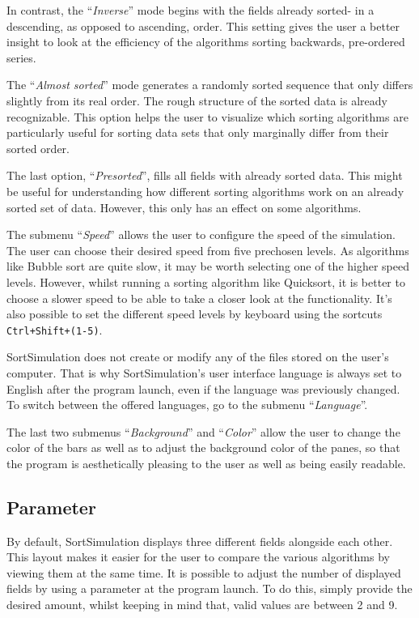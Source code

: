 \documentclass[]{pfBook}
\begin{document}
	In contrast, the ``\emph{Inverse}'' mode begins with the fields already sorted- in a descending, as opposed to ascending, order. This setting gives the user a better insight to look at the efficiency of the algorithms sorting backwards, pre-ordered series.
	
	The ``\emph{Almost sorted}'' mode generates a randomly sorted sequence that only differs slightly from its real order. The rough structure of the sorted data is already recognizable. This option helps the user to visualize which sorting algorithms are particularly useful for sorting data sets that only marginally differ from their sorted order.
	
	The last option, ``\emph{Presorted}'', fills all fields with already sorted data. This might be useful for understanding how different sorting algorithms work on an already sorted set of data. However, this only has an effect on some algorithms. 
	
	The submenu ``\emph{Speed}'' allows the user to configure the speed of the simulation. The user can choose their desired speed from five prechosen levels. As algorithms like Bubble sort are quite slow, it may be worth selecting one of the higher speed levels. However, whilst running a sorting algorithm like Quicksort, it is better to choose a slower speed to be able to take a closer look at the functionality. It's also possible to set the different speed levels by keyboard using the sortcuts \texttt{Ctrl+Shift+(1-5)}.
	
	SortSimulation does not create or modify any of the files stored on the user's computer. That is why SortSimulation's user interface language is always set to English after the program launch, even if the language was previously changed. To switch between the offered languages, go to the submenu ``\emph{Language}''.
	
	The last two submenus ``\emph{Background}'' and ``\emph{Color}'' allow the user to change the color of the bars as well as to adjust the background color of the panes, so that the program is aesthetically pleasing to the user as well as being easily readable.
	
	\subsection{Parameter}
	\label{StartUpArguments}
	
	By default, SortSimulation displays three different fields alongside each other. This layout makes it easier for the user to compare the various algorithms by viewing them at the same time. It is possible to adjust the number of displayed fields by using a parameter at the program launch. To do this, simply provide the desired amount, whilst keeping in mind that, valid values are between 2 and 9.
	
\end{document}
